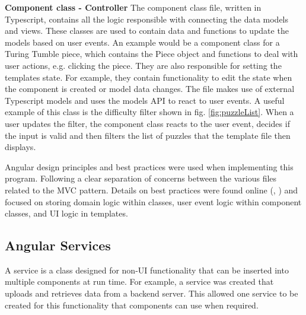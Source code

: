 \documentclass{l4proj}
\begin{document}

\textbf{Component class - Controller}
The component class file, written in Typescript, contains all the logic responsible with connecting the data models and views. These classes are used to contain data and functions to update the models based on user events.  An example would be a component class for a Turing Tumble piece, which contains the Piece object and functions to deal with user actions, e.g. clicking the piece. They are also responsible for setting the templates state. For example, they contain functionality to edit the state when the component is created or model data changes. The file makes use of external Typescript models and uses the models API to react to user events. A useful example of this class is the difficulty filter shown in fig. \ref{fig:puzzleList}. When a user updates the filter, the component class reacts to the user event, decides if the input is valid and then filters the list of puzzles that the template file then displays.

Angular design principles and best practices were used when implementing this program. Following a clear separation of concerns between the various files related to the MVC pattern. Details on best practices were found online (\cite{angular_practices}, \cite{freeman_pro_2017}) and focused on storing domain logic within classes, user event logic within component classes, and UI logic in templates.

\subsection{Angular Services}
A service is a class designed for non-UI functionality that can be inserted into multiple components at run time. For example, a service was created that uploads and retrieves data from a backend server. This allowed one service to be created for this functionality that components can use when required. 
\end{document}
